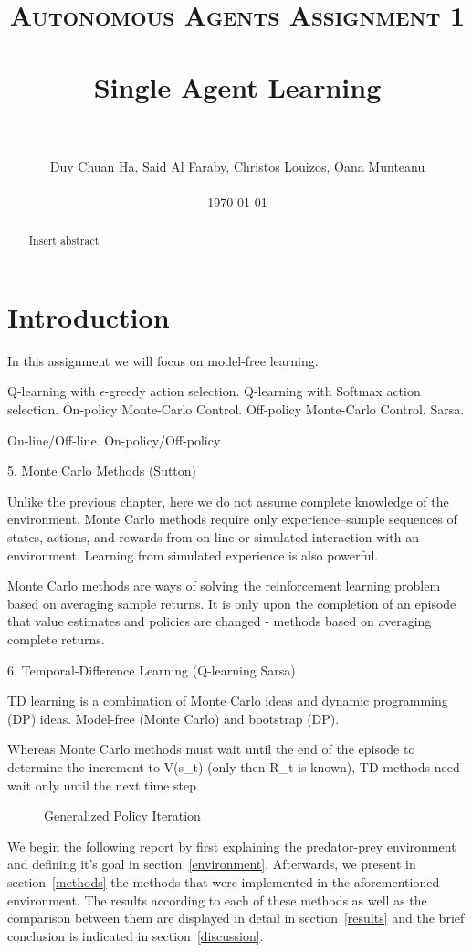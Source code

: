 \documentclass[paper=a4, fontsize=11pt]{scrartcl}
\title{
		\usefont{OT1}{bch}{b}{n}
		\normalfont \normalsize \textsc{Autonomous Agents Assignment 1} \\ [25pt]
		\horrule{0.5pt} \\[0.4cm]
		\huge Single Agent Learning \\
		\horrule{2pt} \\[0.5cm]
}
\author{
        Duy Chuan Ha, Said Al Faraby, Christos Louizos, Oana Munteanu %
        \\
        \\
        \today
}
\date{}
\numberwithin{equation}{section}		%
\numberwithin{figure}{section}			%
\numberwithin{table}{section}				%
\begin{document}
\maketitle
\bigskip
\bigskip
\bigskip
\bigskip
\begin{abstract}
Insert abstract
\end{abstract}

\section{Introduction}

In this assignment we will focus on model-free learning.

Q-learning with $\epsilon$-greedy action selection.
Q-learning with Softmax action selection.
On-policy Monte-Carlo Control.
Off-policy Monte-Carlo Control.
Sarsa.

On-line/Off-line.
On-policy/Off-policy

5. Monte Carlo Methods (Sutton) 

Unlike the previous chapter, here we do not assume complete knowledge of the environment.
Monte Carlo methods require only experience--sample sequences of states, actions, and rewards from on-line or simulated interaction with an environment.
Learning from simulated experience is also powerful.

Monte Carlo methods are ways of solving the reinforcement learning problem based on averaging sample returns.
It is only upon the completion of an episode that value estimates and policies are changed - methods based on averaging complete returns.

6. Temporal-Difference Learning (Q-learning Sarsa)

TD learning is a combination of Monte Carlo ideas and dynamic programming (DP) ideas. 
Model-free (Monte Carlo) and bootstrap (DP).

Whereas Monte Carlo methods must wait until the end of the episode to determine the increment to V(s_t) (only then R_t is  known), TD methods need wait only until the next time step.

\begin{figure}[H] \centering
\caption{Generalized Policy Iteration\cite{suttonBarto}} 
\label{GPI}
\end{figure}

We begin the following report by first explaining the predator-prey environment and defining it's goal in section~\ref{environment}. Afterwards, we present in section~\ref{methods} the methods that were implemented in the aforementioned environment. The results according to each of these methods as well as the comparison between them are displayed in detail in section~\ref{results} and the brief conclusion is indicated in section~\ref{discussion}.
\end{document}
